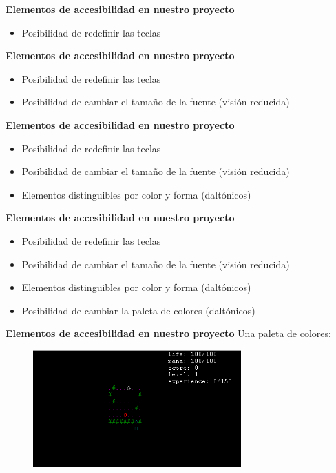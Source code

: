 

\begin{tframe}{\textbf{Elementos de accesibilidad en nuestro proyecto}}
	\begin{itemize}
		\item<+-| alert@+> Posibilidad de redefinir las teclas
	\end{itemize}
\end{tframe}

\begin{tframe}{\textbf{Elementos de accesibilidad en nuestro proyecto}}
	\begin{itemize}
		\item Posibilidad de redefinir las teclas
		\item<+-| alert@+> Posibilidad de cambiar el tamaño de la fuente (visión reducida)
	\end{itemize}
\end{tframe}

\begin{tframe}{\textbf{Elementos de accesibilidad en nuestro proyecto}}
	\begin{itemize}
		\item Posibilidad de redefinir las teclas
		\item Posibilidad de cambiar el tamaño de la fuente (visión reducida)
		\item<+-| alert@+> Elementos distinguibles por color y forma (daltónicos)
	\end{itemize}
\end{tframe}

\begin{tframe}{\textbf{Elementos de accesibilidad en nuestro proyecto}}
	\begin{itemize}
		\item Posibilidad de redefinir las teclas
		\item Posibilidad de cambiar el tamaño de la fuente (visión reducida)
		\item Elementos distinguibles por color y forma (daltónicos)
		\item<+-| alert@+> Posibilidad de cambiar la paleta de colores (daltónicos)
	\end{itemize}
\end{tframe}

\begin{tframe}{\textbf{Elementos de accesibilidad en nuestro proyecto}}
	Una paleta de colores:
		\begin{figure}[h]
			\includegraphics[width=8cm]{../img/paletaColores1.PNG}
		\end{figure}
\end{tframe}

